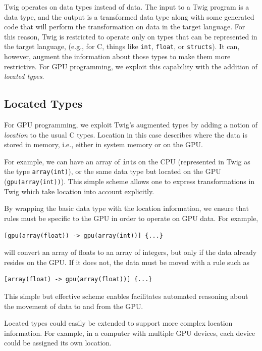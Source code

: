 Twig operates on data types instead of data. The input to a Twig program is a
data type, and the output is a transformed data type along with some generated
code that will perform the transformation on data in the target language. For
this reason, Twig is restricted to operate only on types that can be represented
in the target language, (e.g., for C, things like \texttt{int}, \texttt{float},
or \texttt{structs}). It can, however, augment the information about those types
to make them more restrictive. For GPU programming, we exploit this capability
with the addition of \emph{located types}.

\subsection{Located Types}


For GPU programming, we exploit Twig's augmented types by adding a notion of
\emph{location} to the usual C types. Location in this case describes where the
data is stored in memory, i.e., either in system memory or on the GPU. 

For example, we can have an array of \texttt{int}s on the CPU (represented in
Twig as the type \texttt{array(int)}), or the same data type but located on the
GPU (\texttt{gpu(array(int))}). This simple scheme allows one to express
transformations in Twig which take location into account explicitly.

By wrapping the basic data type with the location information, we ensure that
rules must be specific to the GPU in order to operate on GPU data. For example,

\begin{verbatim}
[gpu(array(float)) -> gpu(array(int))] {...}
\end{verbatim}

will convert an array of floats to an array of integers, but only if the data
already resides on the GPU. If it does not, the data must be moved with a rule
such as

\begin{verbatim}
[array(float) -> gpu(array(float))] {...}
\end{verbatim}

This simple but effective scheme enables facilitates automated reasoning about
the movement of data to and from the GPU.

Located types could easily be extended to support more complex location
information. For example, in a computer with multiple GPU devices, each device
could be assigned its own location.

